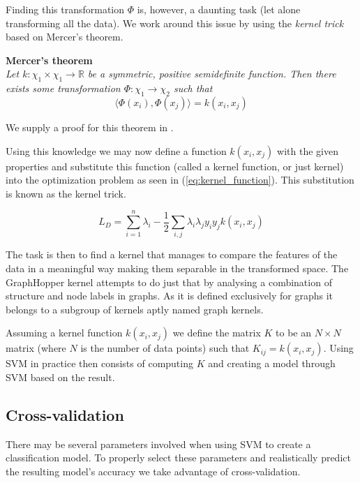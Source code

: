\documentclass{article}
\begin{document}
Finding this transformation $\Phi$ is, however, a daunting task (let alone transforming all the data). We work around this issue by using the \textit{kernel trick} based on Mercer's theorem.

\textbf{Mercer's theorem}\\
\textit{Let $k:\chi_1\times\chi_1\rightarrow\mathbb{R}$ be a symmetric, positive semidefinite\cite{svn-introduction} function. Then there exists some transformation $\Phi:\chi_1\rightarrow\chi_2$ such that}
\begin{equation}
\langle\Phi(x_i),\Phi(x_j)\rangle=k(x_i,x_j)
\end{equation}

We supply a proof for this theorem in \cite{svm-graph-kernels}.

Using this knowledge we may now define a function $k(x_i,x_j)$ with the given properties and substitute this function (called a kernel function, or just kernel) into the optimization problem as seen in (\ref{eq:kernel_function}). This substitution is known as the kernel trick.

\begin{equation}
\label{eq:kernel_function}
L_D = \sum_{i=1}^{n}\lambda_i-\frac{1}{2}\sum_{i,j}\lambda_i\lambda_j y_iy_jk(x_i,x_j)
\end{equation}

The task is then to find a kernel that manages to compare the features of the data in a meaningful way making them separable in the transformed space. The GraphHopper kernel attempts to do just that by analysing a combination of structure and node labels in graphs. As it is defined exclusively for graphs it belongs to a subgroup of kernels aptly named graph kernels.

Assuming a kernel function $k(x_i,x_j)$ we define the matrix $K$ to be an $N\times N$ matrix (where $N$ is the number of data points) such that $K_{ij}=k(x_i,x_j)$. Using SVM in practice then consists of computing $K$ and creating a model through SVM based on the result.

\subsection{Cross-validation}
There may be several parameters involved when using SVM to create a classification model. To properly select these parameters and realistically predict the resulting model's accuracy we take advantage of cross-validation.
\end{document}
